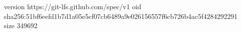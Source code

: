 version https://git-lfs.github.com/spec/v1
oid sha256:51bf6eefd1b7d1a05e5cf07cb6489a9e026156557f6cb726b4ac5f4284292291
size 349692
